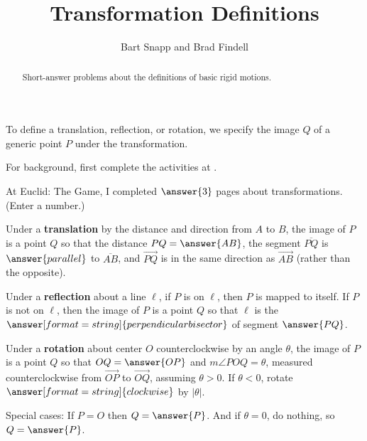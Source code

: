 \documentclass[nooutcomes]{ximera}
\title{Transformation Definitions}
\author{Bart Snapp and Brad Findell}
\begin{document}
\begin{abstract}
Short-answer problems about the definitions of basic rigid motions. 
\end{abstract}
\maketitle

To define a translation, reflection, or rotation, we specify the image $Q$ of a generic point $P$ under the transformation.  

For background, first complete the activities at .

\begin{question}
At Euclid: The Game, I  completed $\answer{3}$ pages about transformations. (Enter a number.)
\end{question}

\begin{question}
Under a \textbf{translation} by the distance and direction from $A$ to $B$, the image of $P$ is a point $Q$ so that the distance $PQ=\answer{AB}$, the segment $\overline{PQ}$ is $\answer{parallel}$ to $\overline{AB}$, and $\overrightarrow{PQ}$ is in the same direction as $\overrightarrow{AB}$ (rather than the opposite).  
\end{question}

\begin{question}
Under a \textbf{reflection} about a line $\ell$, if $P$ is on $\ell$, then $P$ is mapped to itself.  If $P$ is not on $\ell$, then the image of $P$ is a point $Q$ so that $\ell$ is the 
$\answer[format=string]{perpendicular bisector}$ of segment $\answer{PQ}$.  
\end{question}

\begin{question}
Under a \textbf{rotation} about center $O$ counterclockwise by an angle $\theta$, the image of $P$ is 
a point $Q$ so that $OQ = \answer{OP}$ and $m\angle POQ = \theta$, measured counterclockwise 
from $\overrightarrow{OP}$ to $\overrightarrow{OQ}$, assuming $\theta>0$.  If $\theta<0$, rotate $\answer[format=string]{clockwise}$ by $|\theta|$.  

Special cases:  If $P = O$ then $Q=\answer{P}$.  And if $\theta=0$, do nothing, so $Q=\answer{P}$. 
\end{question}

\end{document}
